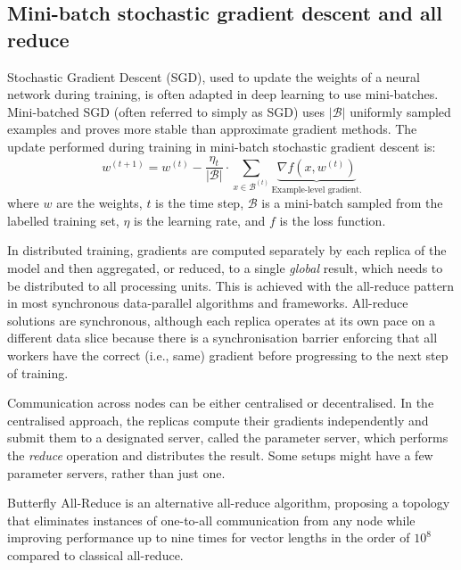 \documentclass{article}
\begin{document}
\subsection{Mini-batch stochastic gradient descent and all reduce}
Stochastic Gradient Descent (SGD), used to update the weights of a neural network during training, is often adapted in deep learning to use mini-batches. Mini-batched SGD (often referred to simply as SGD) uses $\vert \mathcal{B} \vert$ uniformly sampled examples and proves more stable than approximate gradient methods. The update performed during training in mini-batch stochastic gradient descent is:
\begin{equation}
w^{(t + 1)}=w^{(t)}- \frac{\eta_t}{\vert \mathcal{B} \vert} \cdot \sum_{x \in \mathcal{B}^{(t)}} \underbrace{\nabla f\left(x, w^{(t)}\right)}_\text{Example-level gradient.}
\end{equation}
where $w$ are the weights, $t$ is the time step, $\mathcal{B}$ is a mini-batch sampled from the labelled training set, $\eta$ is the learning rate, and $f$ is the loss function.

In distributed training, gradients are computed separately by each replica of the model and then aggregated, or reduced, to a single \textit{global} result, which needs to be distributed to all processing units. This is achieved with the all-reduce pattern in most synchronous data-parallel algorithms and frameworks. All-reduce solutions are synchronous, although each replica operates at its own pace on a different data slice because there is a synchronisation barrier enforcing that all workers have the correct (i.e., same) gradient before progressing to the next step of training.

Communication across nodes can be either centralised or decentralised. In the centralised approach, the replicas compute their gradients independently and submit them to a designated server, called the parameter server, which performs the \textit{reduce} operation and distributes the result. Some setups might have a few parameter servers, rather than just one. %

Butterfly All-Reduce is an alternative all-reduce algorithm, proposing a topology that eliminates instances of one-to-all communication from any node while improving performance up to nine times for vector lengths in the order of $10^8$ \citep{li2017efficient} compared to classical all-reduce.
\end{document}
